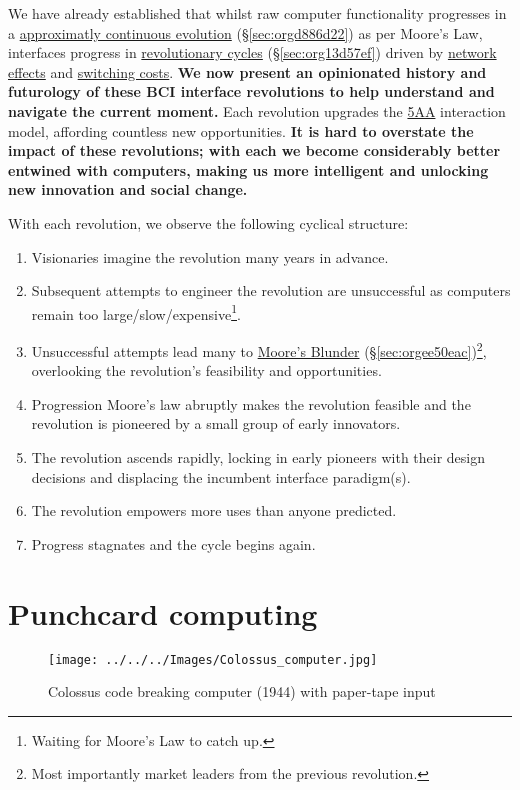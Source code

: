 \documentclass[logo,bsc,singlespacing,parskip]{infthesis}
\begin{document}
We have already established that whilst raw computer functionality progresses in a \hyperref[sec:orgd886d22]{approximatly continuous evolution} (\S \ref{sec:orgd886d22}) as per Moore's Law, interfaces progress in \hyperref[sec:org13d57ef]{revolutionary cycles} (\S \ref{sec:org13d57ef}) driven by \hyperref[network effects]{network effects} and \hyperref[switching costs]{switching costs}.
\textbf{We now present an opinionated history and futurology of these BCI interface revolutions to help understand and navigate the current moment.}
Each revolution upgrades the \hyperref[orgafbfd0c]{5AA} interaction model, affording countless new opportunities.
\textbf{It is hard to overstate the impact of these revolutions; with each we become considerably better entwined with computers, making us more intelligent and unlocking new innovation and social change.}

With each revolution, we observe the following cyclical structure:

\begin{enumerate}
\item Visionaries imagine the revolution many years in advance.
\item Subsequent attempts to engineer the revolution are unsuccessful as computers remain too large/slow/expensive\footnote{Waiting for Moore's Law to catch up.}.
\item Unsuccessful attempts lead many to \hyperref[sec:orgee50eac]{Moore's Blunder} (\S \ref{sec:orgee50eac})\footnote{Most importantly market leaders from the previous revolution.}, overlooking the revolution's feasibility and opportunities.
\item Progression Moore's law abruptly makes the revolution feasible and the revolution is pioneered by a small group of early innovators.
\item The revolution ascends rapidly, locking in early pioneers with their design decisions and displacing the incumbent interface paradigm(s).
\item The revolution empowers more uses than anyone predicted.
\item Progress stagnates and the cycle begins again.
\end{enumerate}
\section{Punchcard computing}
\label{sec:orgb114187}
\begin{wrapfigure}{r}{0.6\textwidth}
\centering
\texttt{[image: ../../../Images/Colossus\_computer.jpg]}
\caption[Colossus code breaking computer (1944)]{Colossus code breaking computer (1944) with paper-tape input}
\end{wrapfigure}
\end{document}
